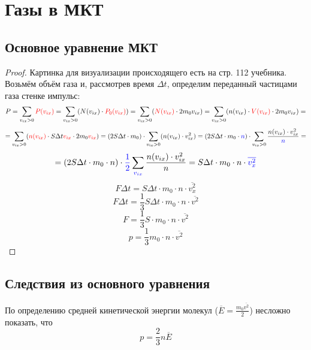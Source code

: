 \section{Газы в МКТ}




\subsection{Основное уравнение МКТ}
\begin{proof}
	Картинка для визуализации происходящего есть на стр. 112 учебника. Возьмём объём газа и, рассмотрев время $\Delta t$, определим переданный частицами газа стенке импульс:
	\[\displaystyle P = \sum_{v_{ix}>0}{\color{red}P(v_{ix})}=\sum_{v_{ix}>0}(N(v_{ix})\cdot{\color{red}P_0(v_{ix})})=\sum_{v_{ix}>0}({\color{red}N(v_{ix})}\cdot2 m_0 v_{ix})=
	\sum_{v_{ix}>0}(n(v_{ix})\cdot {\color{red}V(v_{ix})}\cdot2 m_0 v_{ix})=
	\]
	\[=\sum_{v_{ix}>0}({\color{red}n(v_{ix})}\cdot S \Delta t {\color{red}v_{ix}}\cdot2 m_0 {\color{red}v_{ix}})=
	(2S \Delta t \cdot m_0) \cdot \sum_{v_{ix}>0}(n(v_{ix})\cdot v_{ix}^2)=
	(2S \Delta t \cdot m_0 \cdot {\color{blue}n}) \cdot \sum_{v_{ix}>0}\frac{n(v_{ix})\cdot v_{ix}^2}{\color{blue}n}=\]
	\[
	=(2S \Delta t \cdot m_0 \cdot n) \cdot {\color{blue}\frac{1}{2}}\sum_{\color{blue}v_{ix}}\frac{n(v_{ix})\cdot v_{ix}^2}{n}=
	S \Delta t \cdot m_0 \cdot n \cdot {\color{blue}\overline{v_{x}^2}}
	\]
	\[F \Delta t = S \Delta t \cdot m_0 \cdot n \cdot \overline{v_{x}^2}\]
	\[F \Delta t = \frac{1}{3} S \Delta t \cdot m_0 \cdot n \cdot \overline{v^2}\]
	\[F = \frac{1}{3} S \cdot m_0 \cdot n \cdot \overline{v^2}\]
	\[p = \frac{1}{3} m_0 \cdot n \cdot \overline{v^2}\]
\end{proof}


\subsection{Следствия из основного уравнения}
По определению средней кинетической энергии молекул ($\displaystyle \overline{E}=\frac{m_0\overline{v^2}}{2}$) несложно показать, что 
\begin{equation}
	p = \frac{2}{3} n \overline{E}
\end{equation}

